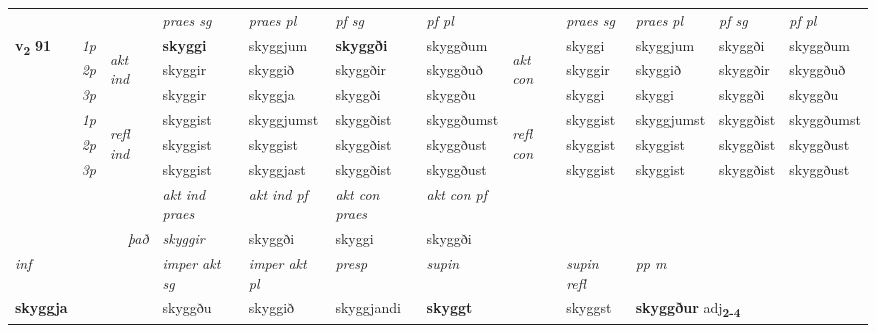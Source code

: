 \begin{longtable}[l]{X>{\footnotesize\itshape}llXXXXlXXXX}
 & &   & \textit{praes sg}  & \textit{praes pl}    & \textit{ pf sg} & \textit{pf pl} & & \textit{praes sg}  & \textit{praes pl}    & \textit{pf sg} & \textit{pf pl }  \\ \cmidrule{4-7} \cmidrule{9-12}
 \multirow{2}{*}{{{\textbf{v{\textsubscript{2}}} \Large{\textbf{91}}}}}  & 1p & \multirow{3}{*}{\begin{turn}{90}\textit{akt ind}\end{turn}} & \textbf{skyggi} & skyggjum & \textbf{skyggði} & skyggðum & \multirow{3}{*}{\begin{turn}{90}\textit{akt con}\end{turn}} &skyggi & skyggjum & skyggði & skyggðum\\*
 & 2p &  &  skyggir  & skyggið & skyggðir & skyggðuð & & skyggir & skyggið & skyggðir & skyggðuð \\*
 & 3p &  & skyggir & skyggja & skyggði & skyggðu & & skyggi & skyggi& skyggði & skyggðu \\*
\cmidrule{4-7} \cmidrule{9-12}
 & 1p & \multirow{3}{*}{\begin{turn}{90}\textit{refl ind}\end{turn}}  & skyggist & skyggjumst & skyggðist & skyggðumst & \multirow{3}{*}{\begin{turn}{90}\textit{refl con}\end{turn}}  &skyggist & skyggjumst & skyggðist & skyggðumst \\*
 & 2p &  & skyggist & skyggist & skyggðist & skyggðust & &skyggist & skyggist & skyggðist & skyggðust \\*
 & 3p  & & skyggist & skyggjast & skyggðist & skyggðust & & skyggist & skyggist& skyggðist & skyggðust \\*
\cmidrule{4-7} \cmidrule{9-12}

   && &  \textit{akt ind praes} & \textit{akt ind pf} & \textit{akt con praes} & \textit{akt con pf} \\*
\multicolumn{3}{r}{\textit{það}} & skyggir & skyggði & skyggi & skyggði \\*

\cmidrule{4-7}
   {\textit{inf}} & &  & \textit{imper akt sg} & \textit{imper akt pl}   & \textit{presp} & \textit{supin} && \textit{supin refl} & \textit{pp m} \\*
  {\textbf{skyggja}} & && skyggðu  & skyggið   & skyggjandi &  \textbf{skyggt} && skyggst & \multicolumn{2}{l}{\textbf{skyggður} adj\textbf{\textsubscript{2-4}}} \\*


\end{longtable}
